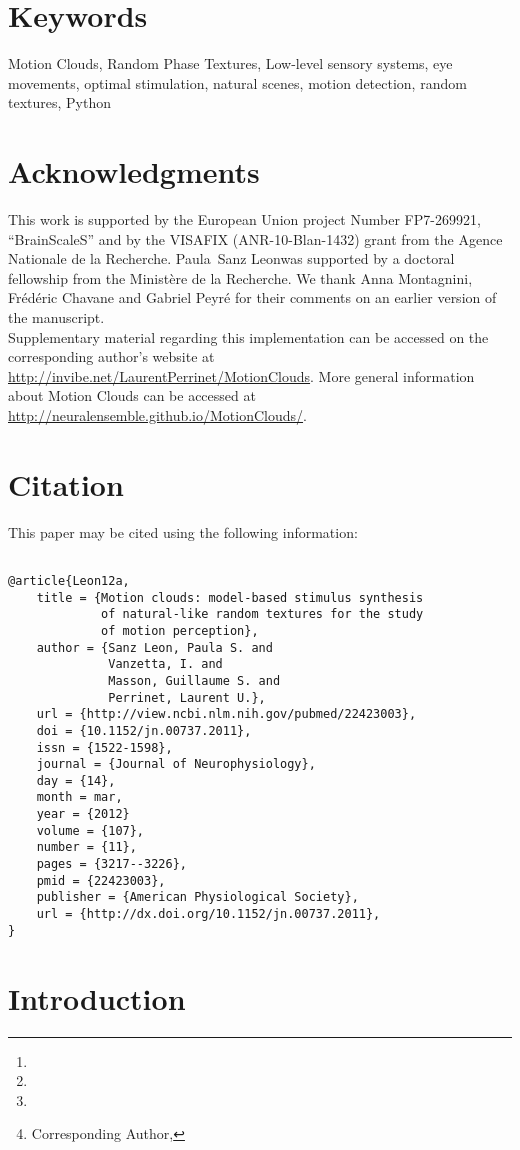 \documentclass[a4paper,11pt]{article}%
\title{\Title}%
\author[1,2]{\AuthorA \thanks{\EmailA}}
\author[1,2]{\AuthorB \thanks{\EmailB}}
\author[1,2]{\AuthorC \thanks{\EmailC}}
\author[1,2]{\AuthorD \thanks{Corresponding Author, \EmailD}}%
\affil[1]{\AddressA}
\affil[2]{\AddressB}
\date{}%
\newcommand{\AuthorA}{Paula~Sanz Leon}%
\newcommand{\Website}{http://invibe.net/LaurentPerrinet}%
\newcommand{\Abstract}{%
Choosing an appropriate set of stimuli is essential in order to characterize the response of a sensory system to a particular functional dimension, such as the eye movement following the motion of a visual scene. %
Here, we describe a framework to generate random texture movies with controlled information content, i.e., Motion Clouds. These stimuli are defined using a generative model which is based on controlled experimental parametrization. %
We show that Motion Clouds correspond to dense mixing of localized moving gratings with random positions. Their global envelope is similar to natural-like stimulation with an approximate full-field translation corresponding to a retinal slip. %
We describe the construction of these stimuli mathematically and propose an open-source python-based implementation. %
Examples of the use of this framework are shown. We also propose extensions to other modalities such as color vision, touch and audition.%
}%
\newcommand{\Keywords}%
{Motion Clouds, Random Phase Textures, Low-level sensory systems, eye movements, optimal stimulation, natural scenes, motion detection, random textures, Python}
\newcommand{\Acknowledgments}{%
This work is supported by the European Union project Number FP7-269921, ``BrainScaleS'' and by the VISAFIX (ANR-10-Blan-1432)  grant from the Agence Nationale de la Recherche. \AuthorA was supported by a doctoral fellowship from the Minist{\`e}re de la Recherche. We thank Anna Montagnini, Fr\'ed\'eric Chavane and Gabriel Peyr\'e for their comments on an earlier version of the manuscript. \\ Supplementary material regarding this implementation can be accessed on the corresponding author's website at \url{\Website/MotionClouds}. More general information about Motion Clouds can be accessed at \url{http://neuralensemble.github.io/MotionClouds/}.  }%
\begin{document}
\maketitle
\begin{abstract}
\Abstract
\end{abstract}%
\section*{Keywords}
\Keywords
\section*{Acknowledgments}
\Acknowledgments
\section*{Citation}
This paper may be cited using the following information:
\begin{verbatim}

@article{Leon12a,
    title = {Motion clouds: model-based stimulus synthesis 
             of natural-like random textures for the study 
             of motion perception},
    author = {Sanz Leon, Paula S. and 
              Vanzetta, I. and 
              Masson, Guillaume S. and 
              Perrinet, Laurent U.},
    url = {http://view.ncbi.nlm.nih.gov/pubmed/22423003},
    doi = {10.1152/jn.00737.2011},
    issn = {1522-1598},
    journal = {Journal of Neurophysiology},
    day = {14},
    month = mar,
    year = {2012}
    volume = {107},
    number = {11},
    pages = {3217--3226},
    pmid = {22423003},
    publisher = {American Physiological Society},
    url = {http://dx.doi.org/10.1152/jn.00737.2011},
}

\end{verbatim}
\section{Introduction }\label{intro}
\end{document}
